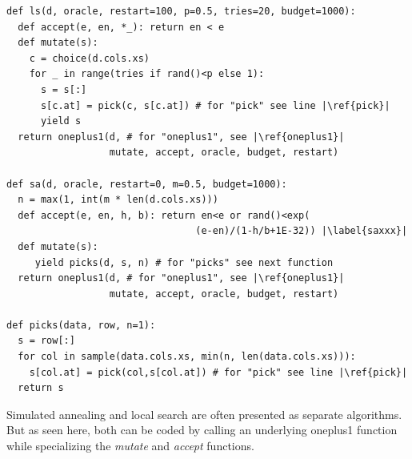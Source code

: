 \documentclass[AMA,STIX2COL]{WileyNJDv5}
\begin{document}
\begin{lstlisting}
def ls(d, oracle, restart=100, p=0.5, tries=20, budget=1000): 
  def accept(e, en, *_): return en < e
  def mutate(s):
    c = choice(d.cols.xs)
    for _ in range(tries if rand()<p else 1):
      s = s[:]
      s[c.at] = pick(c, s[c.at]) # for "pick" see line |\ref{pick}|
      yield s
  return oneplus1(d, # for "oneplus1", see |\ref{oneplus1}|
                  mutate, accept, oracle, budget, restart)
 
def sa(d, oracle, restart=0, m=0.5, budget=1000): 
  n = max(1, int(m * len(d.cols.xs)))
  def accept(e, en, h, b): return en<e or rand()<exp(
                                 (e-en)/(1-h/b+1E-32)) |\label{saxxx}|
  def mutate(s): 
     yield picks(d, s, n) # for "picks" see next function
  return oneplus1(d, # for "oneplus1", see |\ref{oneplus1}|
                  mutate, accept, oracle, budget, restart)

def picks(data, row, n=1): 
  s = row[:]
  for col in sample(data.cols.xs, min(n, len(data.cols.xs))):
    s[col.at] = pick(col,s[col.at]) # for "pick" see line |\ref{pick}|
  return s
\end{lstlisting}
Simulated annealing and local search are often presented as separate
algorithms. But as seen here, both can be coded by calling an
underlying \textsf{oneplus1} function while specializing the
{\em mutate} and {\em accept} functions.
\end{document}
